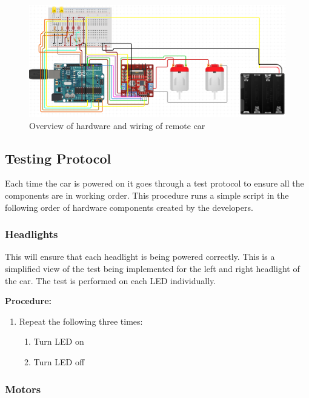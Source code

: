 \documentclass[letterpaper,12pt]{report}
\begin{document}
    \begin{figure}[H]
        \centering
        \includegraphics[width=\linewidth]{diagrams/Design_Hardware_Schematic.png}
        \caption{Overview of hardware and wiring of remote car}
        \label{fig:hardware}
    \end{figure}

    \subsection{Testing Protocol}

    Each time the car is powered on it goes through a test protocol to ensure
    all the components are in working order. This procedure runs a simple script
    in the following order of hardware components created by the developers.

    \subsubsection{Headlights}

    This will ensure that each headlight is being powered correctly. This is a
    simplified view of the test being implemented for the left and right
    headlight of the car. The test is performed on each LED individually.

    \textbf{Procedure:}
    \begin{enumerate}
        \item Repeat the following three times:
            \begin{enumerate}
                \item Turn LED on
                \item Turn LED off
            \end{enumerate}
    \end{enumerate}
    
    \subsubsection{Motors}
\end{document}
